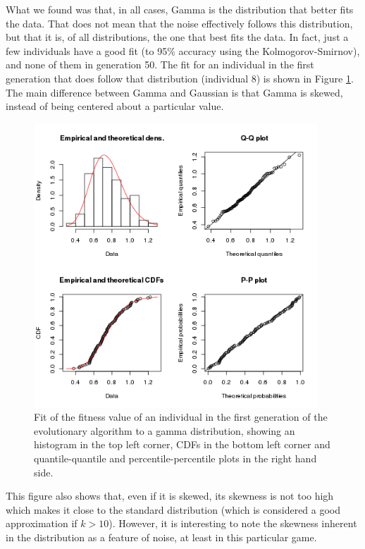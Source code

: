 \documentclass{llncs}
\begin{document}
What we found was that, in all cases, Gamma is the distribution that
better fits the data. That does not mean that the noise effectively
follows this distribution, but that it is, of all distributions, the
one that best fits the data. In fact, just a few individuals have a good fit (to
95\% accuracy using the Kolmogorov-Smirnov), and none of them in
generation 50. The fit for an individual in the first generation that
does follow that distribution (individual 8) is shown in Figure
\ref{fig:indi8}. The main difference between Gamma and Gaussian is
that Gamma is skewed, instead of being centered about a particular
value. 
%
\begin{figure}[!t] %
\centering
\includegraphics[width=0.95\textwidth]{../images/indi8.png}
\caption{Fit of the fitness value of an individual in the first
  generation of the evolutionary algorithm to a gamma distribution,
  showing an histogram in the top left corner, CDFs in the bottom left
  corner and quantile-quantile and percentile-percentile plots in the
  right hand side. \label{fig:indi8}}
\end{figure}

This figure also shows that, even if it is skewed, its skewness is not
too high which makes it close to the standard distribution (which is
considered a good
approximation if $k>10$). However, it is interesting to note the
skewness inherent in the distribution as a feature of noise, at least
in this particular game. 
\end{document}
